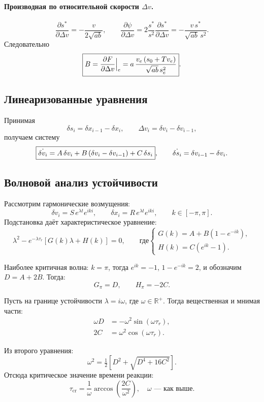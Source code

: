 \paragraph{Производная по относительной скорости $\Delta v$.}
\[
\frac{\partial s^\ast}{\partial\Delta v}=-\frac{v}{2\sqrt{ab}},\qquad
\frac{\partial \psi}{\partial \Delta v}
=2\frac{s^\ast}{s^{2}}\frac{\partial s^\ast}{\partial\Delta v}
=-\frac{v\,s^\ast}{\sqrt{ab}\,s^{2}} .
\]
Следовательно
\[
\boxed{%
B=\Bigl.\frac{\partial F}{\partial\Delta v}\Bigr|_{e}
=a\,\frac{v_e\,(s_0+Tv_e)}{\sqrt{ab}\,s_e^{2}} }.
\]

\subsection{ Линеаризованные уравнения}

Принимая
\[
\delta s_i=\delta x_{i-1}-\delta x_i,\qquad
\Delta v_i=\delta v_i-\delta v_{i-1},
\]
получаем систему
\[
\boxed{%
\dot{\delta v_i}=A\,\delta v_i
+B\,(\delta v_i-\delta v_{i-1})
+C\,\delta s_i },\qquad
\dot{\delta s_i}= \delta v_{i-1}-\delta v_i .
\]

\subsection{ Волновой анализ устойчивости}

Рассмотрим гармонические возмущения:
\[
\delta v_i = S\,e^{\lambda t} e^{i k i}, \qquad \delta x_i = R\,e^{\lambda t} e^{i k i}, \qquad k \in [-\pi, \pi].
\]
Подстановка даёт характеристическое уравнение:
\[
\boxed{
	\lambda^2 - e^{-\lambda \tau_r} \left[G(k)\lambda + H(k)\right] = 0,
}
\qquad\text{где}
\begin{cases}
	G(k) = A + B(1 - e^{-ik}),\\
	H(k) = C(e^{ik} - 1).
\end{cases}
\]

Наиболее критичная волна: $k = \pi$, тогда $e^{ik} = -1$, $1 - e^{-ik} = 2$,
и обозначим $D = A + 2B$. Тогда:
\[
G_\pi = D, \qquad H_\pi = -2C.
\]

Пусть на границе устойчивости $\lambda = i\omega$, где $\omega \in \mathbb{R}^+$.
Тогда вещественная и мнимая части:
\[
\begin{aligned}
	\omega D &= -\omega^2 \sin(\omega \tau_r),\\
	2C &= \omega^2 \cos(\omega \tau_r).
\end{aligned}
\]

Из второго уравнения:
\[
\omega^2 = \tfrac{1}{2} \left[ D^2 + \sqrt{D^4 + 16C^2} \right].
\]
Отсюда критическое значение времени реакции:
\[
\boxed{
	\tau_{\mathrm{cr}} = \frac{1}{\omega} \arccos\left(\frac{2C}{\omega^2}\right), \quad \omega \text{ — как выше}.
}
\]

